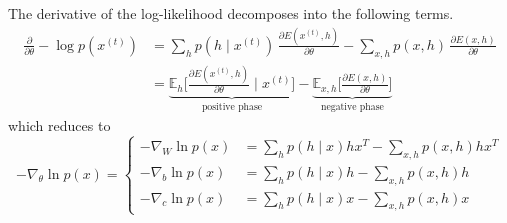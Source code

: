     \begin{theorem}
      The derivative of the log-likelihood decomposes into the following terms. 
      \begin{align} 
        \frac{\partial}{\partial \theta} - \log p(x^{(t)}) & = \sum_{h}  p(h \mid x^{(t)}) \, \frac{ \partial E(x^{(t)}, h)}{\partial \theta} - \sum_{x, h} p(x, h) \, \frac{\partial E(x, h)}{\partial \theta} \\
                                                           & = \underbrace{\mathbb{E}_{h} \bigg[ \frac{\partial E( x^{(t)}, h)}{\partial \theta} \; \bigg| \; x^{(t)} \bigg]}_{\text{positive phase}} - \underbrace{\mathbb{E}_{x, h} \bigg[ \frac{\partial E(x, h)}{\partial \theta} \bigg]}_{\text{negative phase}}
      \end{align}
      which reduces to 
      \begin{equation}
        -\nabla_\theta \ln{p(x)} = \begin{cases}
          - \nabla_W \ln{p(x)} & = \sum_h p(h \mid x) h x^T - \sum_{x, h} p(x, h) h x^T \\
          - \nabla_b \ln{p(x)} & =  \sum_h p(h \mid x) h - \sum_{x, h} p(x, h) h \\
          - \nabla_c \ln{p(x)} & =  \sum_h p(h \mid x) x - \sum_{x, h} p(x, h) x
        \end{cases}
      \end{equation}
    \end{theorem}
